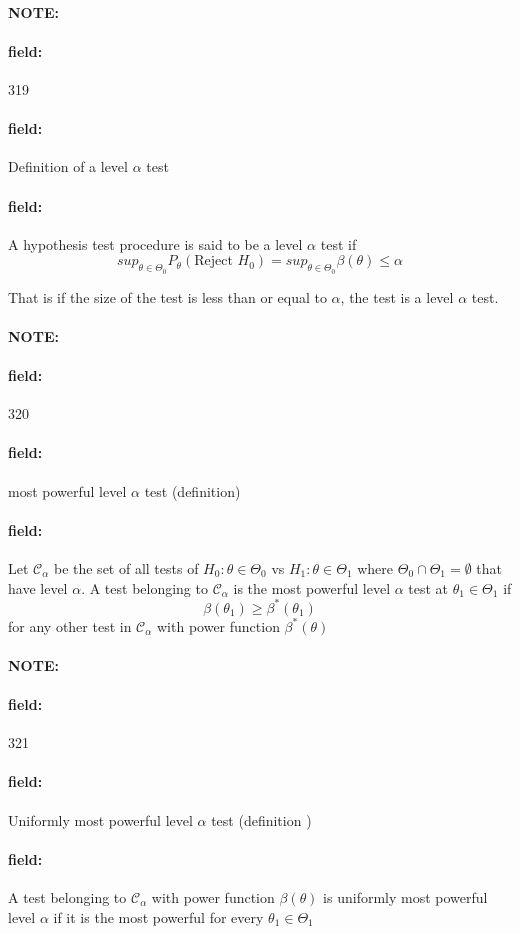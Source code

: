\documentclass[12pt]{article}
\newenvironment{note}{\paragraph{NOTE:}}{}
\newenvironment{field}{\paragraph{field:}}{}
\begin{document}
\begin{note}
    \begin{field}
        \tiny 319
    \end{field}
    \begin{field}
        Definition of a level $\alpha$ test
    \end{field}
    \begin{field}
        A hypothesis test procedure is said to be a level $\alpha$ test if
        $$ sup_{\theta \in \Theta_0}P_{\theta}(\text{Reject } H_0) = sup_{\theta \in \Theta_0} \beta(\theta) \leq \alpha$$

        That is if the size of the test is less than or equal to $\alpha$, the test is a level $\alpha$ test.
    \end{field}
\end{note}

\begin{note}
    \begin{field}
        \tiny 320
    \end{field}
    \begin{field}
        most powerful level $\alpha$ test (definition)
    \end{field}
    \begin{field}
        Let $\mathscr{C}_\alpha$ be the set of all tests of $H_0: \theta \in \Theta_0$ vs $H_1: \theta \in \Theta_1$ where $\Theta_0 \cap \Theta_1 = \emptyset$ that have level $\alpha$. A test belonging to $\mathscr{C}_\alpha$ is the most powerful level $\alpha$ test at $\theta_1 \in \Theta_1$ if
        $$\beta(\theta_1) \geq \beta^*(\theta_1)$$
        for any other test in $\mathscr{C}_\alpha$ with power function $\beta^*(\theta)$
    \end{field}
\end{note}

\begin{note}
    \begin{field}
        \tiny 321
    \end{field}
    \begin{field}
        Uniformly most powerful level $\alpha$ test (definition )
    \end{field}
    \begin{field}
        A test belonging to $\mathscr{C}_\alpha$ with power function $\beta(\theta)$ is uniformly most powerful level $\alpha$ if it is the most powerful for every $\theta_1 \in \Theta_1$

    \end{field}
\end{note}
\end{document}
